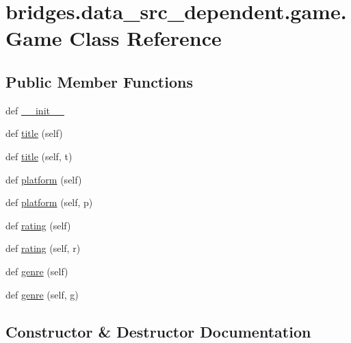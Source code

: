 \hypertarget{classbridges_1_1data__src__dependent_1_1game_1_1_game}{}\section{bridges.\+data\+\_\+src\+\_\+dependent.\+game.\+Game Class Reference}
\label{classbridges_1_1data__src__dependent_1_1game_1_1_game}
\subsection*{Public Member Functions}
\begin{DoxyCompactItemize}
\item 
def \mbox{\hyperlink{classbridges_1_1data__src__dependent_1_1game_1_1_game_aeeaed2287f616f6ec9ff8c2bd6f07835}{\+\_\+\+\_\+init\+\_\+\+\_\+}}
\item 
def \mbox{\hyperlink{classbridges_1_1data__src__dependent_1_1game_1_1_game_a05838d85c567aa7ece895ca34ef2051b}{title}} (self)
\item 
def \mbox{\hyperlink{classbridges_1_1data__src__dependent_1_1game_1_1_game_ae2b0f2f1bbbf2d11c669079b075c6ad1}{title}} (self, t)
\item 
def \mbox{\hyperlink{classbridges_1_1data__src__dependent_1_1game_1_1_game_a6ded3cef2be4f19c8775f1b6c760d2d5}{platform}} (self)
\item 
def \mbox{\hyperlink{classbridges_1_1data__src__dependent_1_1game_1_1_game_ac7b692ca0b04271799d5bdd5117e3102}{platform}} (self, p)
\item 
def \mbox{\hyperlink{classbridges_1_1data__src__dependent_1_1game_1_1_game_a232bceb05cb6b595350deedb7091573b}{rating}} (self)
\item 
def \mbox{\hyperlink{classbridges_1_1data__src__dependent_1_1game_1_1_game_a132b50aaeb278283c91e71baafcd7510}{rating}} (self, r)
\item 
def \mbox{\hyperlink{classbridges_1_1data__src__dependent_1_1game_1_1_game_a280133072fb9bfd6c9ba3c30e3f04dd1}{genre}} (self)
\item 
def \mbox{\hyperlink{classbridges_1_1data__src__dependent_1_1game_1_1_game_a15a0bab4c77405c3825474228dddb470}{genre}} (self, g)
\end{DoxyCompactItemize}


\subsection{Constructor \& Destructor Documentation}
\mbox{\label{classbridges_1_1data__src__dependent_1_1game_1_1_game_aeeaed2287f616f6ec9ff8c2bd6f07835}} 
